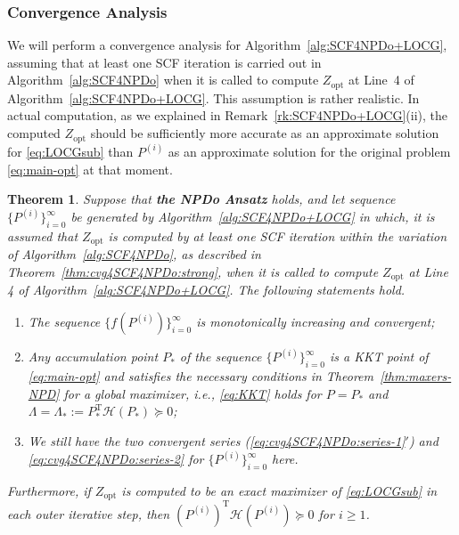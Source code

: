 \documentclass[11pt]{article}
\def\scrH{\mathscr{H}}
\def\wtd{\widetilde}
\DeclareMathOperator*{\opt}{opt}
\DeclareMathOperator{\T}{T}
\def\Blue{\textcolor{blue}}
\newtheorem{theorem}{Theorem}[section]
\theoremstyle{definition}
\numberwithin{equation}{section}
\begin{document}
\subsubsection*{Convergence Analysis}
We will perform a convergence analysis for Algorithm~\ref{alg:SCF4NPDo+LOCG}, assuming that
at least one SCF iteration is carried out in Algorithm~\ref{alg:SCF4NPDo} when it is called
        to compute $Z_{\opt}$ at Line~4 of Algorithm~\ref{alg:SCF4NPDo+LOCG}.
This assumption is rather realistic.
In actual computation, as we explained
in Remark~\ref{rk:SCF4NPDo+LOCG}(ii), the computed $Z_{\opt}$ should be sufficiently more accurate
as an approximate solution for \eqref{eq:LOCGsub} than $P^{(i)}$ as an approximate solution for the original
problem \eqref{eq:main-opt} at that moment.



\begin{theorem}\label{thm:cvg4SCFvLOCG}
Suppose that {\bf the NPDo Ansatz} holds, and let sequence $\{P^{(i)}\}_{i=0}^{\infty}$ be generated by Algorithm~\ref{alg:SCF4NPDo+LOCG} in which, it is assumed that
$Z_{\opt}$ is computed by at least one SCF iteration within the variation of
Algorithm~\ref{alg:SCF4NPDo}, as described in Theorem~\ref{thm:cvg4SCF4NPDo:strong},
when it is called to compute $Z_{\opt}$ at Line 4 of Algorithm~\ref{alg:SCF4NPDo+LOCG}.
The following statements hold.
\begin{enumerate}[{\rm (a)}]
  \item The sequence $\{f(P^{(i)})\}_{i=0}^{\infty}$ is monotonically increasing and convergent;
  \item Any accumulation point $P_*$ of the sequence $\{P^{(i)}\}_{i=0}^{\infty}$ is a KKT point of \eqref{eq:main-opt} and
        satisfies the necessary conditions in Theorem~\ref{thm:maxers-NPD} for a global maximizer, i.e.,
        \eqref{eq:KKT} holds for $P=P_*$ and $\Lambda=\Lambda_*:=P_*^{\T}\scrH(P_*)\succeq 0$;
  \item We still have the two convergent series {\rm (\ref{eq:cvg4SCF4NPDo:series-1}$'$)} and \eqref{eq:cvg4SCF4NPDo:series-2} for $\{P^{(i)}\}_{i=0}^{\infty}$ here.
\end{enumerate}
Furthermore, if $Z_{\opt}$ is computed to
        be an exact maximizer of \eqref{eq:LOCGsub} in each outer iterative step, then
$(P^{(i)})^{\T}\scrH(P^{(i)})\succeq 0$ for $i\ge 1$.
\end{theorem}
\end{document}
